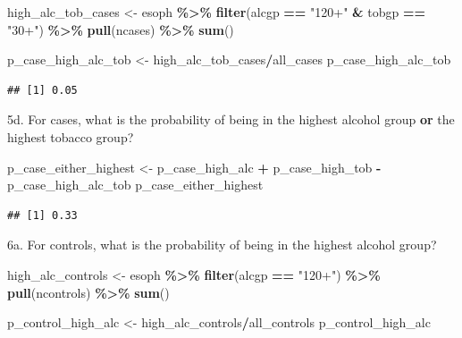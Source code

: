 \documentclass[
]{article}
\newenvironment{Shaded}{\begin{snugshade}}{\end{snugshade}}
\newcommand{\KeywordTok}[1]{\textcolor[rgb]{0.13,0.29,0.53}{\textbf{#1}}}
\newcommand{\NormalTok}[1]{#1}
\newcommand{\OperatorTok}[1]{\textcolor[rgb]{0.81,0.36,0.00}{\textbf{#1}}}
\newcommand{\StringTok}[1]{\textcolor[rgb]{0.31,0.60,0.02}{#1}}
\begin{document}
\begin{Shaded}
\begin{Highlighting}[]
\NormalTok{high\_alc\_tob\_cases \textless{}{-}}\StringTok{ }\NormalTok{esoph }\OperatorTok{\%\textgreater{}\%}
\StringTok{  }\KeywordTok{filter}\NormalTok{(alcgp }\OperatorTok{==}\StringTok{ "120+"} \OperatorTok{\&}\StringTok{ }\NormalTok{tobgp }\OperatorTok{==}\StringTok{ "30+"}\NormalTok{) }\OperatorTok{\%\textgreater{}\%}
\StringTok{  }\KeywordTok{pull}\NormalTok{(ncases) }\OperatorTok{\%\textgreater{}\%}
\StringTok{  }\KeywordTok{sum}\NormalTok{()}

\NormalTok{p\_case\_high\_alc\_tob \textless{}{-}}\StringTok{ }\NormalTok{high\_alc\_tob\_cases}\OperatorTok{/}\NormalTok{all\_cases}
\NormalTok{p\_case\_high\_alc\_tob}
\end{Highlighting}
\end{Shaded}

\begin{verbatim}
## [1] 0.05
\end{verbatim}

5d. For cases, what is the probability of being in the highest alcohol
group \textbf{or} the highest tobacco group?

\begin{Shaded}
\begin{Highlighting}[]
\NormalTok{p\_case\_either\_highest \textless{}{-}}\StringTok{ }\NormalTok{p\_case\_high\_alc }\OperatorTok{+}\StringTok{ }\NormalTok{p\_case\_high\_tob }\OperatorTok{{-}}\StringTok{ }\NormalTok{p\_case\_high\_alc\_tob}
\NormalTok{p\_case\_either\_highest}
\end{Highlighting}
\end{Shaded}

\begin{verbatim}
## [1] 0.33
\end{verbatim}

6a. For controls, what is the probability of being in the highest
alcohol group?

\begin{Shaded}
\begin{Highlighting}[]
\NormalTok{high\_alc\_controls \textless{}{-}}\StringTok{ }\NormalTok{esoph }\OperatorTok{\%\textgreater{}\%}
\StringTok{  }\KeywordTok{filter}\NormalTok{(alcgp }\OperatorTok{==}\StringTok{ "120+"}\NormalTok{) }\OperatorTok{\%\textgreater{}\%}
\StringTok{  }\KeywordTok{pull}\NormalTok{(ncontrols) }\OperatorTok{\%\textgreater{}\%}
\StringTok{  }\KeywordTok{sum}\NormalTok{()}

\NormalTok{p\_control\_high\_alc \textless{}{-}}\StringTok{ }\NormalTok{high\_alc\_controls}\OperatorTok{/}\NormalTok{all\_controls}
\NormalTok{p\_control\_high\_alc}
\end{Highlighting}
\end{Shaded}
\end{document}
